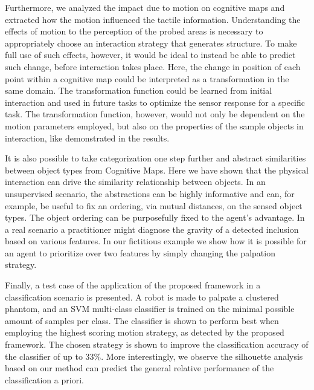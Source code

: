 Furthermore, we analyzed the impact due to motion on cognitive maps and extracted how the motion influenced 
the tactile information. Understanding the effects of motion to the perception of the probed areas 
is necessary to appropriately choose an interaction strategy that generates structure.
To make full use of such effects, however, it would be ideal to instead be able 
to predict such change, before interaction takes place. Here, the change in position 
of each point within a cognitive map could be interpreted as a transformation in the same domain. 
The transformation function could be learned from initial interaction and used in future tasks to 
optimize the sensor response for a specific task. The transformation function, however, would not only be 
dependent on the motion parameters employed, but also on the properties of the sample objects in interaction, 
like demonstrated in the results. 

It is also possible to take categorization one step further and abstract 
similarities between object types from Cognitive Maps. Here we have shown that the physical interaction 
can drive the similarity relationship between objects.
In an unsupervised scenario, the abstractions can be highly informative and can, 
for example, be useful to fix an ordering, via mutual distances, on the sensed object types. 
The object ordering can be purposefully fixed to the agent's advantage. In a real scenario
a practitioner might diagnose the gravity of a detected inclusion based on various features. 
In our fictitious example we show how it is possible for an agent to prioritize over two features by 
simply changing the palpation strategy. 
\color{red}

Finally, a test case of the application of the proposed framework in a classification scenario is presented.
A robot is made to palpate a clustered phantom, and an SVM multi-class classifier is trained on the minimal possible amount of samples per class.
The classifier is shown to perform best when employing the highest scoring motion strategy, as detected by the proposed framework. The chosen strategy is shown to improve the classification accuracy of the classifier of up to 33\%. More interestingly, we observe the silhouette analysis based on our method can predict the general relative performance of the classification a priori. 
\color{black}


